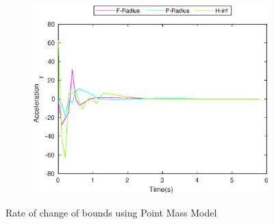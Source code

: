 \begin{figure}[!h]
\begin{subfigure}{.5\linewidth}
\end{subfigure}
\begin{subfigure}{.5\linewidth}
\centering
\includegraphics[width=.9\linewidth]{figures/BoundChange/PM/pm_bound_changeAcceleration_y}
\end{subfigure}
\caption{Rate of change of bounds using Point Mass Model}
\end{figure}